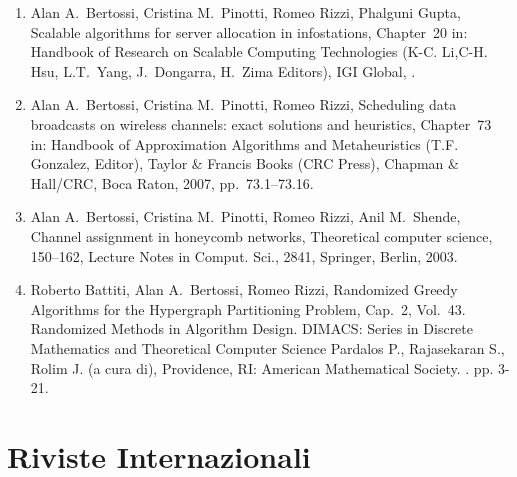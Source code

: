 \documentclass[11pt]{article}
\begin{document}
\begin{enumerate}
  \item {\sc Alan A.~Bertossi, Cristina M.~Pinotti, Romeo Rizzi, Phalguni Gupta},
   \newblock  Scalable algorithms for server allocation in infostations,
   \newblock  Chapter~20 in:
               Handbook of Research on Scalable Computing Technologies
   \newblock (K-C. Li,C-H. Hsu, L.T.~Yang, J.~Dongarra, H.~Zima Editors),
   \newblock  IGI Global,
   .

  \item {\sc Alan A.~Bertossi, Cristina M.~Pinotti, Romeo Rizzi},
   \newblock  Scheduling data broadcasts on wireless channels:
               exact solutions and heuristics,
   \newblock  Chapter~73 in:
               Handbook of Approximation Algorithms and Metaheuristics
   \newblock (T.F. Gonzalez, Editor),
   \newblock  Taylor \& Francis Books (CRC Press),
   \newblock Chapman \& Hall/CRC, Boca Raton, 2007, pp.~73.1--73.16.

  \item {\sc Alan A.~Bertossi, Cristina M.~Pinotti, Romeo Rizzi, Anil M.~Shende},
   \newblock  Channel assignment in honeycomb networks,
   \newblock Theoretical computer science,  150--162,
   \newblock Lecture Notes in Comput. Sci., 2841,
   \newblock Springer, Berlin, 2003.

  \item {\sc Roberto Battiti, Alan A.~Bertossi, Romeo Rizzi},  
   \newblock  Randomized Greedy Algorithms 
              for the Hypergraph Partitioning Problem,
   \newblock Cap.~2, Vol.~43.
   \newblock Randomized Methods in Algorithm Design.
   \newblock DIMACS: Series in Discrete Mathematics
             and Theoretical Computer Science
   \newblock Pardalos P., Rajasekaran S., Rolim J. (a cura di),
             Providence, RI: American Mathematical Society.
   . pp. 3-21.

\end{enumerate}


\section{Riviste Internazionali}
\end{document}
